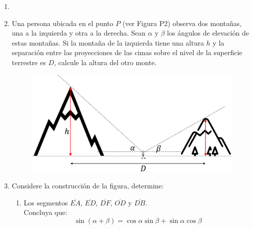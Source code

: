 \documentclass[letterpaper,11pt]{article}
\begin{document}
\vspace{-1cm}
\begin{enumerate}\setlength{\itemsep}{0.4cm}\addtocounter{enumi}{-1}


\item[]


%     

\item Una persona ubicada en el punto $P$ (ver Figura P2) observa dos montañas, una a la izquierda y otra a la derecha. Sean $\alpha$ y $\beta$ los ángulos de elevación de estas montañas. Si la montaña de la izquierda tiene una altura $h$ y la separación entre las proyecciones de las cimas sobre el nivel de la superficie terrestre es $D$, calcule la altura del otro monte. 


\begin{figure}[H]
    \centering
    \includegraphics[width=0.4\linewidth]{2021-1/Imagenes/aux0/mountain.pdf}
\end{figure}


\item Considere la construcción de la figura, determine:

\begin{multicols}{2}
    \begin{figure}[H]
        \centering
        
    \end{figure}
    \columnbreak
    \begin{enumerate}
        \item Los segmentos $\overline{EA}$, $\overline{ED}$, $\overline{DF}$, $\overline{OD}$ y $\overline{DB}$.\\
        Concluya que:
        $$\sin\left(\alpha+\beta\right)=\cos\alpha\sin\beta+\sin\alpha\cos\beta$$
        

\end{enumerate}
\end{multicols}
\end{enumerate}
\end{document}

